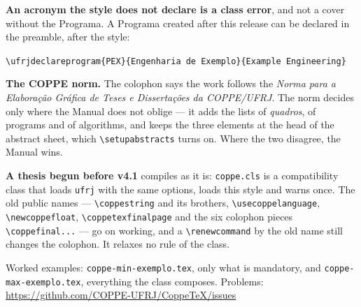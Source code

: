 \documentclass[a4paper,10pt]{article}
\begin{document}
\vspace{4pt}
\begin{center}
\begin{minipage}{0.92\textwidth}\small
\textbf{An acronym the style does not declare is a class error}, and not a
cover without the Programa. A Programa created after this release can be
declared in the preamble, after the style:

\medskip
\verb|\ufrjdeclareprogram{PEX}{Engenharia de Exemplo}{Example Engineering}|

\medskip
\textbf{The COPPE norm.} The colophon says the work follows the
\emph{Norma para a Elaboração Gráfica de Teses e Dissertações da COPPE/UFRJ}.
The norm decides only where the Manual does not oblige --- it adds the lists of
\emph{quadros}, of programs and of algorithms, and keeps the three elements at
the head of the abstract sheet, which \verb|\setupabstracts| turns on. Where
the two disagree, the Manual wins.

\medskip
\textbf{A thesis begun before v4.1} compiles as it is: \texttt{coppe.cls} is a
compatibility class that loads \texttt{ufrj} with the same options, loads this
style and warns once. The old public names --- \verb|\coppestring| and its
brothers, \verb|\usecoppelanguage|, \verb|\newcoppefloat|,
\verb|\coppetexfinalpage| and the six colophon pieces \verb|\coppefinal...| ---
go on working, and a \verb|\renewcommand| by the old name still changes the
colophon. It relaxes no rule of the class.

\medskip
Worked examples: \texttt{coppe-min-exemplo.tex}, only what is mandatory, and
\texttt{coppe-max-exemplo.tex}, everything the class composes.\quad
Problems: \url{https://github.com/COPPE-UFRJ/CoppeTeX/issues}
\end{minipage}
\end{center}
\end{document}

